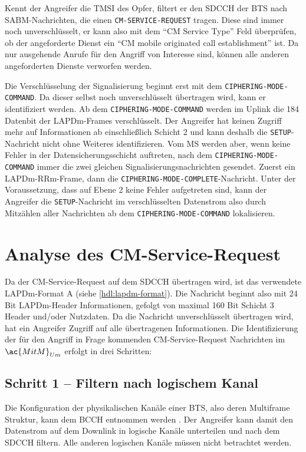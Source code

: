 Kennt der Angreifer die \ac{TMSI} des Opfer, filtert er den \ac{SDCCH} der \ac{BTS} nach \ac{SABM}-Nachrichten, die einen \texttt{CM-SERVICE-REQUEST} tragen. Diese sind immer noch unverschlüsselt, er kann also mit dem "`\ac{CM} Service Type"' Feld überprüfen, ob der angeforderte Dienst ein "`\ac{CM} mobile originated call establishment"' ist. Da nur ausgehende Anrufe für den Angriff von Interesse sind, können alle anderen angeforderten Dienste verworfen werden.

Die Verschlüsselung der Signalisierung beginnt erst mit dem \texttt{CIPHERING-MODE-COMMAND}. Da dieser selbst noch unverschlüsselt übertragen wird, kann er identifiziert werden. Ab dem \texttt{CIPHERING-MODE-COMMAND} werden im Uplink die 184 Datenbit der \ac{LAPDm}-Frames verschlüsselt. Der Angreifer hat keinen Zugriff mehr auf Informationen ab einschließlich Schicht 2 und kann deshalb die \texttt{SETUP}-Nachricht nicht ohne Weiteres identifizieren. Vom \ac{MS} werden aber, wenn keine Fehler in der Datensicherungsschicht auftreten, nach dem \texttt{CIPHERING-MODE-COMMAND} immer die zwei gleichen Signalisierungsnachrichten gesendet. Zuerst ein \ac{LAPDm}-\ac{RRm}-Frame, dann die \texttt{CIPHERING-MODE-COMPLETE}-Nachricht. Unter der Voraussetzung, dass auf Ebene 2 keine Fehler aufgetreten sind, kann der Angreifer die \texttt{SETUP}-Nachricht im verschlüsselten Datenstrom also durch Mitzählen aller Nachrichten ab dem \texttt{CIPHERING-MODE-COMMAND} lokalisieren. 

\section{Analyse des CM-Service-Request}

Da der \ac{CM}-Service-Request auf dem \ac{SDCCH} übertragen wird, ist das verwendete \ac{LAPDm}-Format A (siehe \autoref{hdl:lapdm-format}). Die Nachricht beginnt also mit 24 Bit \ac{LAPDm}-Header Informationen, gefolgt von maximal 160 Bit Schicht 3 Header und/oder Nutzdaten. Da die Nachricht unverschlüsselt übertragen wird, hat ein Angreifer Zugriff auf alle übertragenen Informationen. Die Identifizierung der für den Angriff in Frage kommenden \ac{CM}-Service-Request Nachrichten im $\ac{MitM}_{Um}$ erfolgt in drei Schritten:

\subsection*{Schritt 1 -- Filtern nach logischem Kanal}

Die Konfiguration der physikalischen Kanäle einer \ac{BTS}, also deren Multiframe Struktur, kann dem \ac{BCCH} entnommen werden . Der Angreifer kann damit den Datenstrom auf dem Downlink in logische Kanäle unterteilen und nach dem \ac{SDCCH} filtern. Alle anderen logischen Kanäle müssen nicht betrachtet werden.

